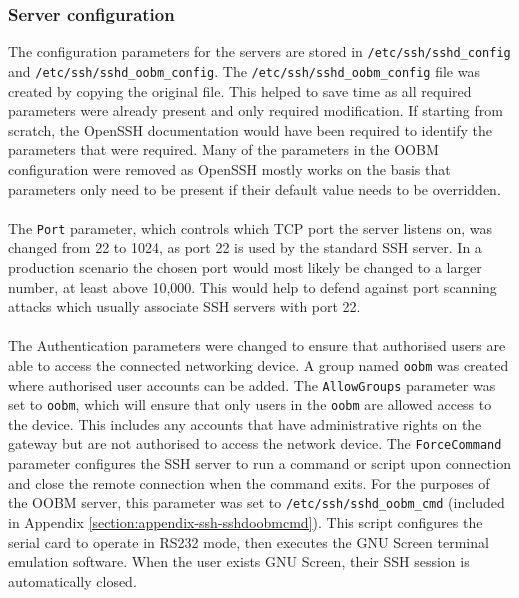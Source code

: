 \subsubsection{Server configuration}
\label{subsubsection:dev-sshdaemon-configuration-sshdoobmconfig}
The configuration parameters for the servers are stored in \verb|/etc/ssh/sshd_config| and \verb|/etc/ssh/sshd_oobm_config|. The \verb|/etc/ssh/sshd_oobm_config| file was created by copying the original file. This helped to save time as all required parameters were already present and only required modification. If starting from scratch, the OpenSSH documentation would have been required to identify the parameters that were required. Many of the parameters in the OOBM configuration were removed as OpenSSH mostly works on the basis that parameters only need to be present if their default value needs to be overridden. \\\\
The \verb|Port| parameter, which controls which TCP port the server listens on, was changed from 22 to 1024, as port 22 is used by the standard SSH server. In a production scenario the chosen port would most likely be changed to a larger number, at least above 10,000. This would help to defend against port scanning attacks which usually associate SSH servers with port 22.\\\\
The Authentication parameters were changed to ensure that authorised users are able to access the connected networking device. A group named \verb|oobm| was created where authorised user accounts can be added. The \verb|AllowGroups| parameter was set to \verb|oobm|, which will ensure that only users in the \verb|oobm| are allowed access to the device. This includes any accounts that have administrative rights on the gateway but are not authorised to access the network device. The \verb|ForceCommand| parameter configures the SSH server to run a command or script upon connection and close the remote connection when the command exits. For the purposes of the OOBM server, this parameter was set to \verb|/etc/ssh/sshd_oobm_cmd| (included in Appendix \ref{section:appendix-ssh-sshdoobmcmd}). This script configures the serial card to operate in RS232 mode, then executes the GNU Screen terminal emulation software. When the user exists GNU Screen, their SSH session is automatically closed.

